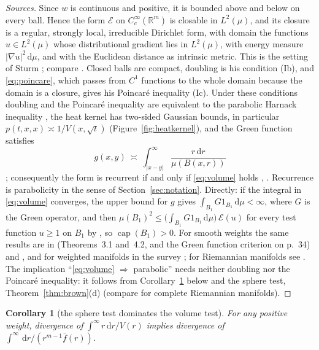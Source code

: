 \documentclass[11pt]{amsart}
\newcommand{\R}{\mathbb{R}}
\newcommand{\dd}{\,\mathrm{d}}
\newcommand{\abs}[1]{\lvert #1\rvert}
\newcommand{\fbar}{\bar f}
\DeclareMathOperator{\capa}{cap}
\theoremstyle{plain}
\newtheorem{corollary}[theorem]{Corollary}
\theoremstyle{definition}
\theoremstyle{remark}
\begin{document}
\begin{proof}[Sources]
Since $w$ is continuous and positive, it is bounded above and below on every
ball. Hence the form $\mathcal E$ on $C_c^\infty(\R^m)$ is closable in
$L^2(\mu)$, and its closure is a regular, strongly local, irreducible
Dirichlet form, with domain the functions $u\in L^2(\mu)$ whose
distributional gradient lies in $L^2(\mu)$, with energy measure
$\abs{\nabla u}^2\dd\mu$, and with the Euclidean distance as intrinsic metric.
This is the setting of Sturm \cite{sturm1994,sturm1995,sturm1996}; compare
\cite[Example~5\,B]{sturm1996}. Closed balls are compact, doubling is his
condition (Ib), and \eqref{eq:poincare}, which passes from $C^1$ functions to
the whole domain because the domain is a closure, gives his Poincar\'e
inequality (Ic). Under these conditions doubling and the Poincar\'e
inequality are equivalent to the parabolic Harnack inequality
\cite[Thm.~3.5]{sturm1996}, the heat kernel has two-sided Gaussian bounds, in
particular $p(t,x,x)\asymp1/V(x,\sqrt t)$ (Figure~\ref{fig:heatkernel}), and
the Green function satisfies
\[
g(x,y)\ \asymp\ \int_{\abs{x-y}}^\infty\frac{r\dd r}{\mu(B(x,r))}
\]
\cite[Cor.~4.11]{sturm1996}; consequently the form is recurrent if and only
if \eqref{eq:volume} holds \cite[Cor.~4.12]{sturm1996},
\cite[Cor.~2.9]{sturm1995}. Recurrence is parabolicity in the sense of
Section~\ref{sec:notation}. Directly: if the integral in \eqref{eq:volume}
converges, the upper bound for $g$ gives
$\int_{B_1}G1_{B_1}\dd\mu<\infty$, where $G$ is the Green operator, and then
$\mu(B_1)^2\le\bigl(\int_{B_1}G1_{B_1}\dd\mu\bigr)\,\mathcal E(u)$ for every
test function $u\ge1$ on $B_1$ by
\cite[Lemma~1.5.3]{fukushimaoshimatakeda2011}, so $\capa(B_1)>0$. For smooth
weights the same results are in \cite{saloffcoste1992} (Theorems~3.1 and~4.2,
and the Green function criterion on p.~34) and \cite{grigoryan1991}, and for
weighted manifolds in the survey \cite{grigoryan2006}; for Riemannian
manifolds see \cite[Thm.~11.1]{grigoryan1999}. The implication
``\eqref{eq:volume} $\Rightarrow$ parabolic'' needs neither doubling nor the
Poincar\'e inequality: it follows from Corollary~\ref{cor:cs} below and the
sphere test, Theorem~\ref{thm:brown}(d) (compare
\cite[Thm.~7.3]{grigoryan1999} for complete Riemannian manifolds).
\end{proof}

\begin{corollary}[the sphere test dominates the volume test]\label{cor:cs}
For any positive weight, divergence of $\int^\infty r\dd r/V(r)$ implies
divergence of $\int^\infty\dd r/(r^{m-1}\fbar(r))$.
\end{corollary}
\end{document}

